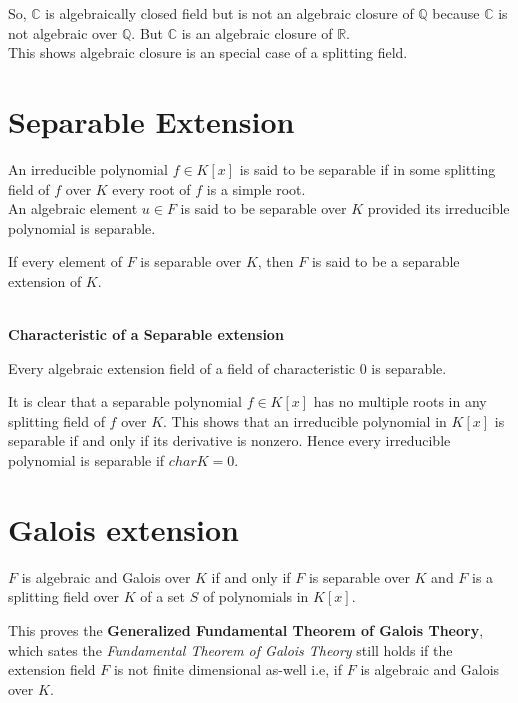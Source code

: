 So, \(\mathbb{C}\) is algebraically closed field but is not an algebraic closure of \(\mathbb{Q}\) because \(\mathbb{C}\) is not algebraic over \(\mathbb{Q}\).
But \(\mathbb{C}\) is an algebraic closure of \(\mathbb{R}\).\\
This shows algebraic closure is an special case of a splitting field.

\section{Separable Extension}
An irreducible polynomial \(f \in K[x]\) is said to be separable if in some splitting field of \(f\) over \(K\) every root of \(f\) is a simple root.\\
An algebraic element \(u \in F\) is said to be separable over \(K\) provided its irreducible polynomial is separable.
\begin{definition}
  If every element of \(F\) is separable over \(K\), then \(F\) is said to be a separable extension of \(K\).\\ \\
\end{definition}
\noindent
\textbf{Characteristic of a Separable extension}
\begin{remark}
  Every algebraic extension field of a field of characteristic \(0\) is separable.
  \end{remark}

It is clear that a separable polynomial \(f \in K[x]\) has no multiple roots in any splitting field of \(f\) over \(K\). This shows that an irreducible polynomial in \(K[x]\) is separable if and only if its derivative is nonzero. Hence every irreducible polynomial is separable if \(char K = 0\).


\section{Galois extension}
\begin{theorem}
  \(F\) is algebraic and Galois over \(K\) if and only if \(F\) is separable over \(K\) and \(F\) is a splitting field over \(K\) of a set \(S\) of polynomials in \(K[x]\).\\
  \end{theorem}

This proves the \textbf{Generalized Fundamental Theorem of Galois Theory},\\
which sates the \textit{Fundamental Theorem of Galois Theory} still holds if the extension field \(F\) is not finite dimensional as-well i.e, if \(F\) is algebraic and Galois over \(K\).

